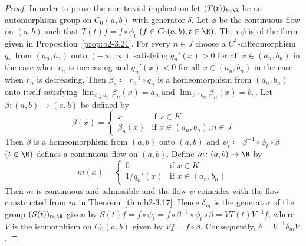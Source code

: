 \begin{proof}
In order to prove the non-trivial implication let $(T(t))_{t \in \R}$ be an automorphism group on $C_{0}(a,b)$ with generator $\delta$.
Let $\phi$ be the continuous flow on $(a,b)$ such that $T(t)f = f \circ \phi_{t}$ $(f \in C_{0}(a,b), t \in \R)$.
Then $\phi$ is of the form given in Proposition~\ref{prop:b2-3.21}.
For every $n \in J$ choose a $C^{1}$-diffeomorphism $q_{n}$ from $(a_{n},b_{n})$ onto $(-\infty,\infty)$ satisfying $q_{n}'(x) > 0$ for all $x \in (a_{n},b_{n})$ in the case when $r_{n}$ is increasing and $q_{n}'(x) < 0$ for all $x \in (a_{n},b_{n})$ in the case when $r_{n}$ is decreasing.
Then $\beta_{n} \coloneqq r_{n}^{-1} \circ q_{n}$ is a homeomorphism from $(a_{n},b_{n})$ onto itself satisfying $\lim_{x \downarrow a_{n}}\beta_{n}(x) = a_{n}$ and $\lim_{x \uparrow b_{n}}\beta_{n}(x) = b_{n}$.
Let $\beta \colon (a,b) \to (a,b)$ be defined by
\begin{equation*}\label{eq:b2-beta}
\beta(x) = \begin{cases}
    x & \text{if } x \in K \\
    \beta_{n}(x) & \text{if } x \in (a_{n},b_{n}), n \in J
\end{cases}
\end{equation*}
Then $\beta$ is a homeomorphism from $(a,b)$ onto $(a,b)$ and $\psi_{t} \coloneqq \beta^{-1} \circ \phi_{t} \circ \beta$ $(t \in \R)$ defines a continuous flow on $(a,b)$.
Define $m \colon (a,b) \to \R$ by
\begin{equation*}\label{eq:b2-m-def2}
m(x) = \begin{cases}
    0 & \text{if } x \in K \\
    1/q_{n}'(x) & \text{if } x \in (a_{n},b_{n})
\end{cases}
\end{equation*}
Then $m$ is continuous and admissible and the flow $\psi$ coincides with the flow constructed from $m$ in Theorem~\ref{thm:b2-3.17}.
Hence $\delta_{m}$ is the generator of the group $(S(t))_{t \in \R}$ given by $S(t)f = f \circ \psi_{t} = f \circ \beta^{-1} \circ \phi_{t} \circ \beta = VT(t)V^{-1}f$, where $V$ is the isomorphism on $C_{0}(a,b)$ given by $Vf = f \circ \beta$.
Consequently, $\delta = V^{-1}\delta_{m}V$.
\end{proof}

